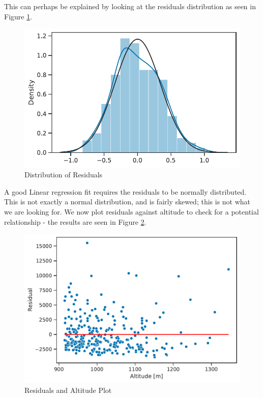 \documentclass[11pt,a4paper]{article}
\begin{document}
\medskip

This can perhaps be explained by looking at the residuals distribution as seen in Figure \ref{fds-project-template:fig:residuals_dist}.

\begin{figure} [h!]
  \centering
  \includegraphics{report/residuals_dist.pdf}
  \caption{Distribution of Residuals}
  \label{fds-project-template:fig:residuals_dist}
\end{figure}

A good Linear regression fit requires the residuals to be normally distributed. This is not exactly a normal distribution, and is fairly skewed; this is not what we are looking for. We now plot residuals against altitude to check for a potential relationship - the results are seen in Figure \ref{fds-project-template:fig:residuals_plot}.

\begin{figure} [h!]
  \centering
  \includegraphics{report/residuals_plot.pdf}
  \caption{Residuals and Altitude Plot}
  \label{fds-project-template:fig:residuals_plot}
\end{figure}
\end{document}
